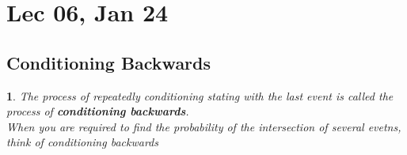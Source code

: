 \documentclass[11pt]{article}
\newtheorem{definition}{\framebox{DEF}}[section]
\begin{document}
    \section{Lec 06, Jan 24}
            \subsection{Conditioning Backwards}
                \begin{definition}
                    The process of repeatedly conditioning stating with the last event is called the process of \textbf{\textit{conditioning backwards}}.\\
                    When you are required to find the probability of the intersection of several evetns, think of conditioning backwards
                \end{definition}
                
\end{document}
